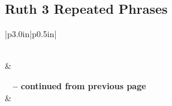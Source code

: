 \subsection{Ruth 3 Repeated Phrases}


\normalsize
 
\begin{center}
\begin{longtable}{|p{3.0in}|p{0.5in}|}
\caption[Ruth 3 Repeated Phrases]{Ruth 3 Repeated Phrases}\label{table:Repeated Phrases Ruth 3} \\
\hline {} &  \\ \hline 
\endfirsthead
 
{{\bfseries \tablename\ \thetable{} -- continued from previous page}} \\  
\hline {} &  \\ \hline 
\endhead
 

\end{longtable}
\end{center}
